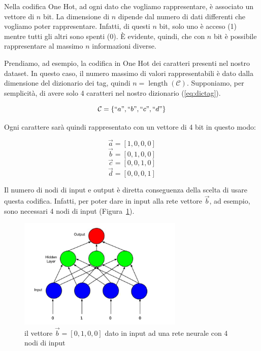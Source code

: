 Nella codifica One Hot, ad ogni dato che vogliamo rappresentare, \`e associato
un vettore di $n$ bit. La dimensione di $n$ dipende dal numero di dati differenti
che vogliamo poter rappresentare. Infatti, di questi $n$ bit, solo uno \`e acceso
(1) mentre tutti gli altri sono spenti (0). \`E evidente, quindi, che con $n$ bit
\`e possibile rappresentare al massimo $n$ informazioni diverse.

Prendiamo, ad esempio, la codifica in One Hot dei caratteri presenti nel nostro
dataset. In questo caso, il numero massimo di valori rappresentabili \`e dato
dalla dimensione del dizionario dei tag, quindi $n = \operatorname{length}
(\mathcal{C})$. Supponiamo, per semplicit\`a, di avere solo 4 caratteri nel nostro
dizionario (\ref{eq:dictag}).

\begin{equation} \label{eq:dictag}
  \mathcal{C} = \{ ``a", ``b", ``c", ``d" \}
\end{equation}

Ogni carattere sar\`a quindi rappresentato con un vettore di 4 bit in questo modo:

\begin{equation}
  \vec{a} = [ 1, 0, 0, 0]
\end{equation}
\begin{equation}
  \vec{b} = [ 0, 1, 0, 0]
\end{equation}
\begin{equation}
  \vec{c} = [ 0, 0, 1, 0]
\end{equation}
\begin{equation}
  \vec{d} = [ 0, 0, 0, 1]
\end{equation}

Il numero di nodi di input e output \`e diretta conseguenza della scelta di usare
questa codifica. Infatti, per poter dare in input alla rete vettore $\vec{b}$, ad
esempio, sono necessari 4 nodi di input (Figura~\ref{fig:nnInputExample}).

\begin{figure}[tp]
  \centering
  \begin{center}
    \includegraphics[width=0.7\textwidth]{./images/nnInputExample.png}
  \end{center}
  \caption{il vettore $\vec{b} = [ 0, 1, 0, 0]$ dato in input ad una rete neurale
  con 4 nodi di input}
  \label{fig:nnInputExample}
\end{figure}

